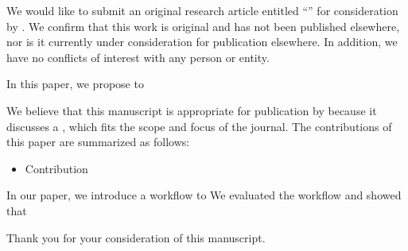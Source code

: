 We would like to submit an original research article entitled ``\paperTitle{}'' for consideration by \journalName{}. We confirm that this work is original and has not been published elsewhere, nor is it currently under consideration for publication elsewhere. In addition, we have no conflicts of interest with any person or entity.

In this paper, we propose to \lipsum[1][2]

We believe that this manuscript is appropriate for publication by \journalName{} because it discusses a \lipsum[1][1], which fits the scope and focus of the journal. The contributions of this paper are summarized as follows:

\begin{itemize}
    \item Contribution
\end{itemize}

In our paper, we introduce a workflow to \lipsum[1][1] We evaluated the workflow and showed that \lipsum[1][1]

Thank you for your consideration of this manuscript.
